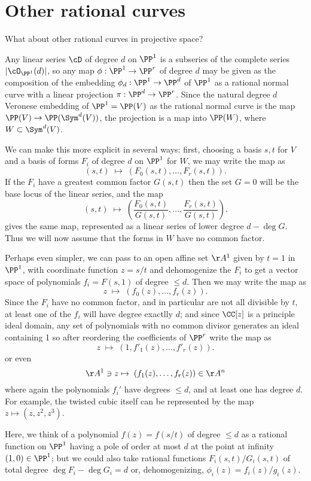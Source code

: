 \section{Other rational curves}

What about other rational curves in projective space? 

Any linear series $\cD$ of degree $d$ on $\PP^1$ is a subseries of the complete series $|\cO_{\PP^1}(d)|$, so any map $\phi : \PP^1 \to \PP^r$ of degree $d$ may be given as the
composition of the embedding $\phi_d : \PP^1 \to \PP^d$ of $\PP^1$ as a rational normal curve with a linear projection $\pi : \PP^d \to \PP^r$. Since the natural degree $d$ Veronese embedding of $\PP^1 = \PP(V)$ as the rational normal curve is the map
$\PP(V) \to \PP(\Sym^d(V))$, the projection is a map into $\PP(W)$, where $W\subset \Sym^d(V)$. 

We can make this more explicit in several ways: first, choosing a basis $s,t$ for $V$ and a basis of forms $F_i$ of degree $d$ on $\PP^1$ for $W$, we may write the map as
$$
(s,t) \; \mapsto \; (F_0(s,t), \dots, F_r(s,t)).
$$
If the $F_i$ have a greatest common factor $G(s,t)$ then the set $G=0$ will be the base locus
of the linear series, and the map
$$
(s,t) \; \mapsto \; ( \frac{F_0(s,t)}{G(s,t)}, \dots, \frac{F_r(s,t)}{G(s,t)}).
$$
gives the same map, represented as a linear series of lower degree $d-\deg G$. Thus we
will now assume that the forms in $W$ have no common factor.

Perhaps even simpler, we can pass to an open affine set $\AA^1$ given by $t=1$ in $\PP^1$, with coordinate function $z = s/t$ and
dehomogenize the $F_i$ to get a vector space of polynomials $f_i = F(s,1)$ of degree $\leq d$. Then we may write the
map as
$$
z \; \mapsto \; (f_0(z), \dots, f_r(z)).
$$
Since the $F_i$ have no common factor, and in particular are not all divisible by $t$, at least one of the
$f_i$ will have degree exactlly $d$; and since $\CC[z]$ is a principle ideal domain, any set of 
polynomials with no common divisor generates an ideal containing 
1 so after reordering the coefficients of $\PP^r$ write the map as
$$
z \; \mapsto \; (1, f'_1(z), \dots, f'_r(z)).
$$
or even
$$
\AA^1 \ni z \mapsto \; (f_1(z), \dots, f_r(z))\in \AA^n
$$
where again the polynomials $f_i'$ have degrees $\leq d$, and at least one has degree $d$.
For example, the twisted cubic itself can be represented by the map
$z \mapsto (z,z^2,z^3)$.

Here, we think of a polynomial $f(z) = f(s/t)$ of degree $\leq d$ as a rational function on $\PP^1$ having
a pole of order at most $d$ at the point at infinity $(1,0)\in \PP^1$; but we could also take rational
functions $F_i(s,t)/G_i(s,t)$ of total degree $\deg F_i-\deg G_i = d$ or, dehomogenizing, $\phi_i(z) = f_i(z)/g_i(z)$.

